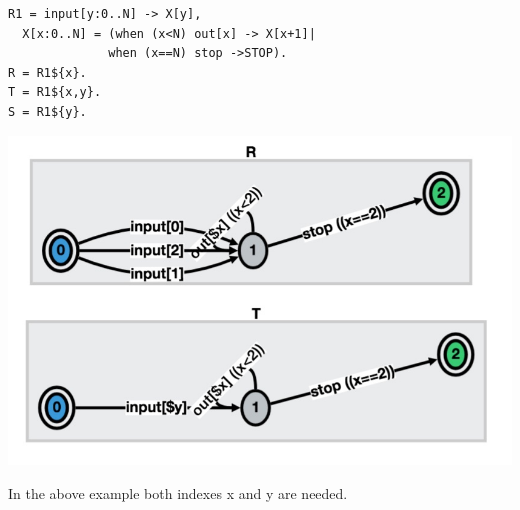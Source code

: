 \documentclass[]{article}
\begin{document}
\vspace{1em} \begin{minipage}{0.55\textwidth}
\begin{verbatim}
R1 = input[y:0..N] -> X[y],
  X[x:0..N] = (when (x<N) out[x] -> X[x+1]|
              when (x==N) stop ->STOP).
R = R1${x}.
T = R1${x,y}.
S = R1${y}.
   \end{verbatim} 
   
\end{minipage}
\begin{minipage}{0.4\textwidth}
\begin{center}\includegraphics[scale=0.2]{VarBug2.jpg}\end{center}
\end{minipage}

In the above example both indexes {\sf x} and {\sf y} are needed.
\end{document}
